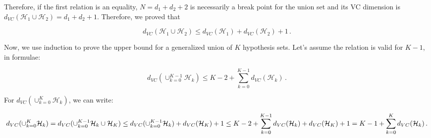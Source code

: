 \documentclass[11pt]{article}
\makeatletter
\newcommand{\boxspacing}{\kern\kvtcb@left@rule\kern\kvtcb@boxsep}
\newcommand{\prompt}[4]{
        \ttfamily\llap{{\color{#2}[#3]:\hspace{3pt}#4}}\vspace{-\baselineskip}
    }
\makeatother
\begin{document}
Therefore, if the first relation is an equality, \(N=d_1+d_2+2\) is
necessarily a break point for the union set and its VC dimension is
\(d_{VC}(\mathcal{H}_1\cup \mathcal{H}_2)=d_1+d_2+1\). Therefore, we
proved that

\[
d_{VC}(\mathcal{H}_1\cup \mathcal{H}_2)\le d_{VC}(\mathcal{H}_1)+d_{VC}(\mathcal{H}_2)+1\,.
\]

Now, we use induction to prove the upper bound for a generalized union
of \(K\) hypothesis sets. Let's assume the relation is valid for
\(K-1\), in formulae:

\[
d_{VC}(\cup_{k=0}^{K-1} \mathcal{H}_k)\le K-2+\sum_{k=0}^{K-1} d_{VC}(\mathcal{H}_k)\,.
\]

For \(d_{VC}(\cup_{k=0}^{K} \mathcal{H}_k)\), we can write:

\[
d_{VC}(\cup_{k=0}^{K} \mathcal{H}_k)= d_{VC}(\cup_{k=0}^{K-1} \mathcal{H}_k \cup \mathcal{H}_K)\le d_{VC}(\cup_{k=0}^{K-1} \mathcal{H}_k)+d_{VC}(\mathcal{H}_K)+1\\ \le K-2+\sum_{k=0}^{K-1} d_{VC}(\mathcal{H}_k)+d_{VC}(\mathcal{H}_K)+1=K-1+\sum_{k=0}^{K} d_{VC}(\mathcal{H}_k)\,.
\]

    \begin{tcolorbox}[breakable, size=fbox, boxrule=1pt, pad at break*=1mm,colback=cellbackground, colframe=cellborder]
\prompt{In}{incolor}{ }{\boxspacing}
\begin{Verbatim}[commandchars=\\\{\}]

\end{Verbatim}
\end{tcolorbox}


    
    
    
\end{document}
